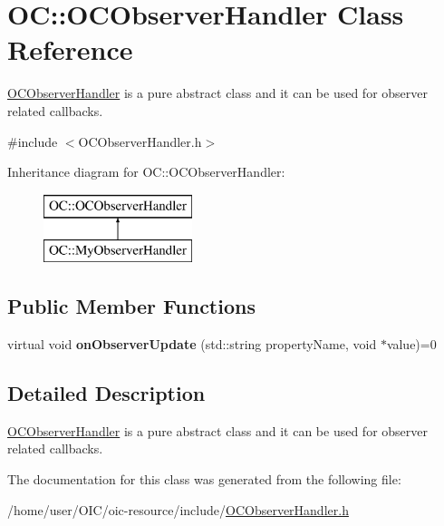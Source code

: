 \hypertarget{classOC_1_1OCObserverHandler}{}\section{O\+C\+:\+:O\+C\+Observer\+Handler Class Reference}
\label{classOC_1_1OCObserverHandler}


\hyperlink{classOC_1_1OCObserverHandler}{O\+C\+Observer\+Handler} is a pure abstract class and it can be used for observer related callbacks.  




{\ttfamily \#include $<$O\+C\+Observer\+Handler.\+h$>$}

Inheritance diagram for O\+C\+:\+:O\+C\+Observer\+Handler\+:\begin{figure}[H]
\begin{center}
\leavevmode
\includegraphics[height=2.000000cm]{classOC_1_1OCObserverHandler}
\end{center}
\end{figure}
\subsection*{Public Member Functions}
\begin{DoxyCompactItemize}
\item 
\hypertarget{classOC_1_1OCObserverHandler_a619e713e6ec000523c3d33b17f2feec0}{}virtual void {\bfseries on\+Observer\+Update} (std\+::string property\+Name, void $\ast$value)=0\label{classOC_1_1OCObserverHandler_a619e713e6ec000523c3d33b17f2feec0}

\end{DoxyCompactItemize}


\subsection{Detailed Description}
\hyperlink{classOC_1_1OCObserverHandler}{O\+C\+Observer\+Handler} is a pure abstract class and it can be used for observer related callbacks. 

The documentation for this class was generated from the following file\+:\begin{DoxyCompactItemize}
\item 
/home/user/\+O\+I\+C/oic-\/resource/include/\hyperlink{OCObserverHandler_8h}{O\+C\+Observer\+Handler.\+h}\end{DoxyCompactItemize}
